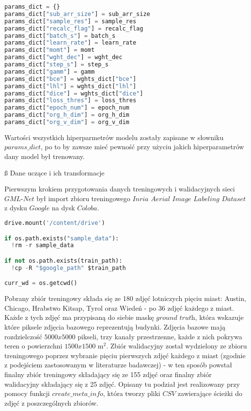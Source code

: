 \cell
\begin{lstlisting}[name=Rozdzial3.1, language=Python]
params_dict = {}
params_dict["sub_arr_size"] = sub_arr_size
params_dict["sample_res"] = sample_res
params_dict["recalc_flag"] = recalc_flag
params_dict["batch_s"] = batch_s
params_dict["learn_rate"] = learn_rate
params_dict["momt"] = momt
params_dict["wght_dec"] = wght_dec
params_dict["step_s"] = step_s
params_dict["gamm"] = gamm
params_dict["bce"] = wghts_dict["bce"]
params_dict["lhl"] = wghts_dict["lhl"]
params_dict["dice"] = wghts_dict["dice"]
params_dict["loss_thres"] = loss_thres
params_dict["epoch_num"] = epoch_num
params_dict["org_h_dim"] = org_h_dim
params_dict["org_v_dim"] = org_v_dim
\end{lstlisting}


\cell
Wartości wszystkich hiperparmetrów modelu zostały zapisane w słowniku $\textit{params$\_$dict}$, po to by zawsze mieć pewność przy użyciu jakich hiperparametrów dany model był trenowany.

\vspace{-0.5cm}
\cell
\ss{ Dane uczące i ich transformacje}

\cell
Pierwszym krokiem przygotowania danych treningowych i walidacyjnych sieci $\textit{GML-Net}$ był import zbioru treningowego $\textit{Inria Aerial Image Labeling Dataset}$ z dysku  $\textit{Google}$ na dysk  $\textit{Coloba}$.
\vspace{1cm}

\cell
\begin{lstlisting}[name=Rozdzial3.1, language=Python]
drive.mount('/content/drive')

if os.path.exists("sample_data"):
  !rm -r sample_data

if not os.path.exists(train_path):
  !cp -R "$google_path" $train_path

curr_wd = os.getcwd()
\end{lstlisting}


\cell
Pobrany zbiór treningowy składa się ze 180 zdjęć lotniczych pięciu miast: Austin, Chicago, Hrabstwo Kitsap, Tyrol oraz Wiedeń - po 36 zdjęć każdego z miast. Każde z tych zdjęć ma przypisaną do siebie maskę $\textit{ground truth}$, która wskazuje które piksele zdjęcia bazowego reprezentują budynki. Zdjęcia bazowe mają rozdzielczość $\textit{5000x5000}$ pikseli, trzy kanały przestrzenne, każde z nich pokrywa teren o powierzchni $\textit{1500x1500}$ m$^2$. Zbiór walidacyjny został wydzielony ze zbioru treningowego poprzez wybranie pięciu pierwszych zdjęć każdego z miast (zgodnie z podejściem zastosowanym w literaturze badawczej) - w ten sposób powstał finalny zbiór treningowy składający się ze 155 zdjęć oraz finalny zbiór walidacyjny składający się z 25 zdjęć. Opisany tu podział jest realizowany przy pomocy funkcji $\textit{create$\_$meta$\_$info}$, która tworzy pliki  $\textit{CSV}$ zawierające ścieżki do zdjęć z poszczególnych zbiorów. 

